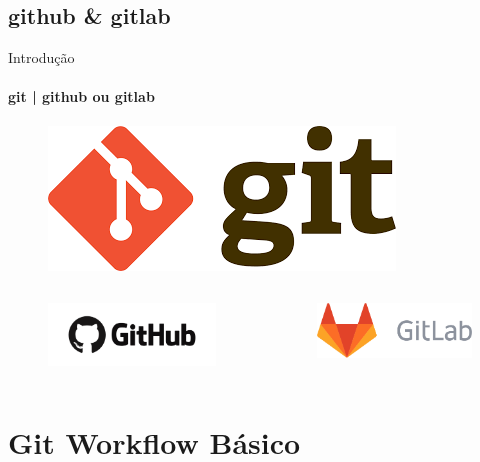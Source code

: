 \documentclass[xcolor=dvipsnames,t]{beamer}
\begin{document}
\subsection{github \& gitlab}
\begin{frame}{Introdução}
\framesubtitle{git | github ou gitlab}

\vfill
\begin{figure}
	\centering
	\includegraphics[width=0.2\linewidth]{figures/gitlogo.png}
\end{figure}
\vfill
\begin{columns}[t]
	\begin{column}{.5\textwidth}
\begin{figure}
	\centering
	\includegraphics[width=0.7\linewidth]{figures/Github_logo}
\end{figure}
	\end{column}
	\begin{column}{.5\textwidth}
\begin{figure}
	\centering
	\includegraphics[width=0.7\linewidth]{figures/GitLab_logo}
\end{figure}
	\end{column}
\end{columns}
\vfill

\end{frame}

\section{Git Workflow Básico}
\end{document}

